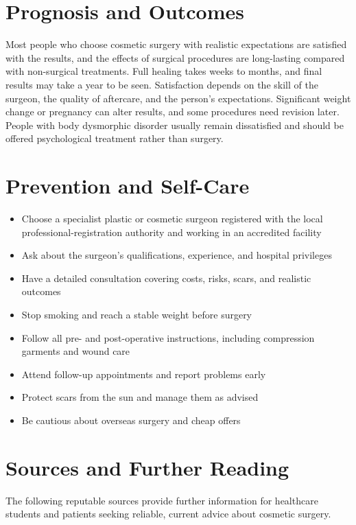 \section*{Prognosis and Outcomes}
Most people who choose cosmetic surgery with realistic expectations are satisfied with the results, and the effects of surgical procedures are long-lasting compared with non-surgical treatments. Full healing takes weeks to months, and final results may take a year to be seen. Satisfaction depends on the skill of the surgeon, the quality of aftercare, and the person's expectations. Significant weight change or pregnancy can alter results, and some procedures need revision later. People with body dysmorphic disorder usually remain dissatisfied and should be offered psychological treatment rather than surgery.

\section*{Prevention and Self-Care}
\begin{itemize}
    \item Choose a specialist plastic or cosmetic surgeon registered with the local professional-registration authority and working in an accredited facility
    \item Ask about the surgeon's qualifications, experience, and hospital privileges
    \item Have a detailed consultation covering costs, risks, scars, and realistic outcomes
    \item Stop smoking and reach a stable weight before surgery
    \item Follow all pre- and post-operative instructions, including compression garments and wound care
    \item Attend follow-up appointments and report problems early
    \item Protect scars from the sun and manage them as advised
    \item Be cautious about overseas surgery and cheap offers
\end{itemize}

\section*{Sources and Further Reading}
The following reputable sources provide further information for healthcare students and patients seeking reliable, current advice about cosmetic surgery.

